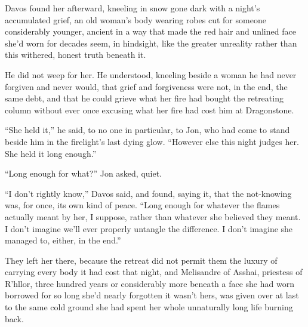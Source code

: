 \sceneBreak

Davos found her afterward, kneeling in snow gone dark with a night’s accumulated grief, an old woman’s body wearing robes cut for someone considerably younger, ancient in a way that made the red hair and unlined face she’d worn for decades seem, in hindsight, like the greater unreality rather than this withered, honest truth beneath it.

He did not weep for her. He understood, kneeling beside a woman he had never forgiven and never would, that grief and forgiveness were not, in the end, the same debt, and that he could grieve what her fire had bought the retreating column without ever once excusing what her fire had cost him at Dragonstone.

“She held it,” he said, to no one in particular, to Jon, who had come to stand beside him in the firelight’s last dying glow. “However else this night judges her. She held it long enough.”

“Long enough for what?” Jon asked, quiet.

“I don’t rightly know,” Davos said, and found, saying it, that the not-knowing was, for once, its own kind of peace. “Long enough for whatever the flames actually meant by her, I suppose, rather than whatever she believed they meant. I don’t imagine we’ll ever properly untangle the difference. I don’t imagine she managed to, either, in the end.”

They left her there, because the retreat did not permit them the luxury of carrying every body it had cost that night, and Melisandre of Asshai, priestess of R’hllor, three hundred years or considerably more beneath a face she had worn borrowed for so long she’d nearly forgotten it wasn’t hers, was given over at last to the same cold ground she had spent her whole unnaturally long life burning back.
